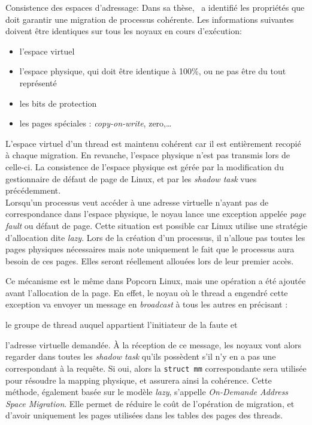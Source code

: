       \begin{paragraph}{Consistence des espaces d'adressage:}
        Dans sa thèse,~\citeauthor{katz2013popcorn} a identifié les propriétés
        que doit garantir une migration de processus cohérente. Les informations
        suivantes doivent être identiques sur tous les noyaux en cours
        d'exécution:
        \begin{itemize}
          \item l'espace virtuel
          \item l'espace physique, qui doit être identique à 100\%, ou ne pas
            être du tout représenté
          \item les bits de protection
          \item les pages spéciales : \textit{copy-on-write}, zero,\ldots\\
        \end{itemize}

        L'espace virtuel d'un thread est maintenu cohérent car il est
        entièrement recopié à chaque migration. En revanche, l'espace physique
        n'est pas transmis lors de celle-ci. La consistence de l'espace physique
        est gérée par la modification du gestionnaire de défaut de page de
        Linux, et par les \textit{shadow task} vues précédemment.\\

        Lorsqu'un processus veut accéder à une adresse virtuelle n'ayant pas de
        correspondance dans l'espace physique, le noyau lance une exception
        appelée \textit{page fault} ou défaut de page. Cette situation est
        possible car Linux utilise une stratégie d'allocation dite
        \textit{lazy}. Lors de la création d'un processus, il n'alloue pas
        toutes les pages physiques nécessaires mais note uniquement le fait que
        le processus aura besoin de ces pages. Elles seront réellement allouées
        lors de leur premier accès.

        Ce mécanisme est le même dans Popcorn Linux, mais une opération a été
        ajoutée avant l'allocation de la page. En effet, le noyau où le thread a
        engendré cette exception va envoyer un message en \textit{broadcast} à
        tous les autres en précisant :\benumline \item le groupe de thread
        auquel appartient l'initiateur de la faute et \item l'adresse virtuelle
        demandée\eenumline. À la réception de ce message, les noyaux vont alors
        regarder dans toutes les \textit{shadow task} qu'ils possèdent s'il n'y
        en a pas une correspondant à la requête. Si oui, alors la \texttt{struct
          mm} correspondante sera utilisée pour résoudre la mapping physique, et
        assurera ainsi la cohérence. Cette méthode, également basée sur le
        modèle \textit{lazy}, s'appelle \textit{On-Demande Address Space
          Migration}. Elle permet de réduire le coût de l'opération de
        migration, et d'avoir uniquement les pages utilisées dans les tables
        des pages des threads.


\end{paragraph}

